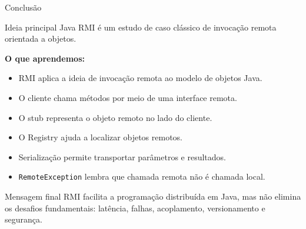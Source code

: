 \documentclass[aspectratio=169]{beamer}
\newcommand{\code}[1]{\texttt{#1}}
\begin{document}
\begin{frame}{Conclusão}
    \begin{block}{Ideia principal}
        Java RMI é um estudo de caso clássico de invocação remota orientada a objetos.
    \end{block}

    \vspace{0.2cm}
    \textbf{O que aprendemos:}
    \begin{itemize}
        \item RMI aplica a ideia de invocação remota ao modelo de objetos Java.
        \item O cliente chama métodos por meio de uma interface remota.
        \item O stub representa o objeto remoto no lado do cliente.
        \item O Registry ajuda a localizar objetos remotos.
        \item Serialização permite transportar parâmetros e resultados.
        \item \code{RemoteException} lembra que chamada remota não é chamada local.
    \end{itemize}

    \vspace{0.2cm}
    \begin{alertblock}{Mensagem final}
        RMI facilita a programação distribuída em Java, mas não elimina os desafios fundamentais: latência, falhas, acoplamento, versionamento e segurança.
    \end{alertblock}
\end{frame}
\end{document}
